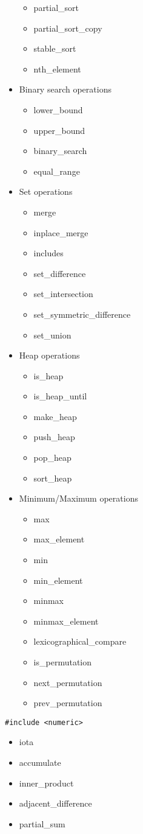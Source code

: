 \begin{itemize}
\begin{itemize}
			\item partial\_sort
			\item partial\_sort\_copy
			\item stable\_sort
			\item nth\_element
		\end{itemize}
	\item Binary search operations
		\begin{itemize}
			\item lower\_bound
			\item upper\_bound
			\item binary\_search
			\item equal\_range
		\end{itemize}
	\item Set operations
		\begin{itemize}
			\item merge
			\item inplace\_merge
			\item includes
			\item set\_difference
			\item set\_intersection
			\item set\_symmetric\_difference
			\item set\_union
		\end{itemize}
	\item Heap operations
		\begin{itemize}
			\item is\_heap
			\item is\_heap\_until
			\item make\_heap
			\item push\_heap
			\item pop\_heap
			\item sort\_heap
		\end{itemize}
	\item Minimum/Maximum operations
		\begin{itemize}
			\item max
			\item max\_element
			\item min
			\item min\_element
			\item minmax
			\item minmax\_element
			\item lexicographical\_compare
			\item is\_permutation
			\item next\_permutation
			\item prev\_permutation
		\end{itemize}
\end{itemize}
\begin{lstlisting}
#include <numeric>
\end{lstlisting}
\begin{itemize}
	\item iota
	\item accumulate
	\item inner\_product
	\item adjacent\_difference
	\item partial\_sum
\end{itemize}

